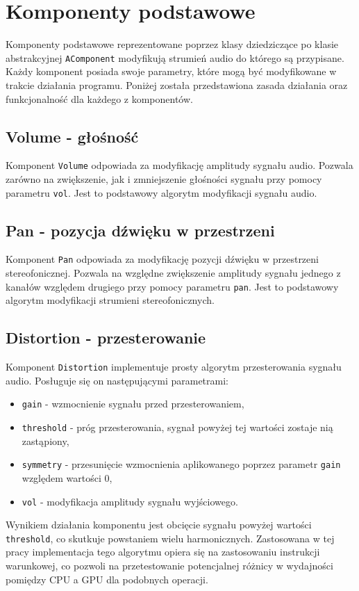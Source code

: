 \section{Komponenty podstawowe}
Komponenty podstawowe reprezentowane poprzez klasy dziedziczące po klasie abstrakcyjnej \texttt{AComponent} modyfikują strumień audio do którego są przypisane. Każdy komponent posiada swoje parametry, które mogą być modyfikowane w trakcie działania programu. Poniżej została przedstawiona zasada działania oraz funkcjonalność dla każdego z komponentów. 

\subsection{Volume - głośność}
Komponent \texttt{Volume} odpowiada za modyfikację amplitudy sygnału audio. Pozwala zarówno na zwiększenie, jak i zmniejszenie głośności sygnału przy pomocy parametru \texttt{vol}. Jest to podstawowy algorytm modyfikacji sygnału audio.

\subsection{Pan - pozycja dźwięku w przestrzeni}
Komponent \texttt{Pan} odpowiada za modyfikację pozycji dźwięku w przestrzeni stereofonicznej. Pozwala na względne zwiększenie amplitudy sygnału jednego z kanałów względem drugiego przy pomocy parametru \texttt{pan}. Jest to podstawowy algorytm modyfikacji strumieni stereofonicznych.

\subsection{Distortion - przesterowanie}
Komponent \texttt{Distortion} implementuje prosty algorytm przesterowania sygnału audio. Posługuje się on następującymi parametrami:
\begin{itemize}
    \item \texttt{gain} - wzmocnienie sygnału przed przesterowaniem,
    \item \texttt{threshold} - próg przesterowania, sygnał powyżej tej wartości zostaje nią zastąpiony,
    \item \texttt{symmetry} - przesunięcie wzmocnienia aplikowanego poprzez parametr \texttt{gain} względem wartości 0,
    \item \texttt{vol} - modyfikacja amplitudy sygnału wyjściowego.
\end{itemize}
Wynikiem działania komponentu jest obcięcie sygnału powyżej wartości \texttt{threshold}, co skutkuje powstaniem wielu harmonicznych.
Zastosowana w tej pracy implementacja tego algorytmu opiera się na zastosowaniu instrukcji warunkowej, co pozwoli na przetestowanie potencjalnej różnicy w wydajności pomiędzy CPU a GPU dla podobnych operacji. 

